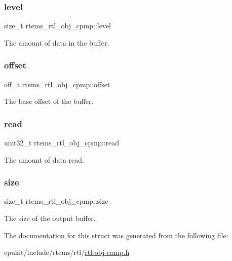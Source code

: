\subsubsection{\texorpdfstring{level}{level}}
{\footnotesize\ttfamily size\+\_\+t rtems\+\_\+rtl\+\_\+obj\+\_\+cpmp\+::level}

The amount of data in the buffer. \mbox{\label{structrtems__rtl__obj__cpmp_af1a66e96bb39b71256675bb98ac9f70d}} 
\subsubsection{\texorpdfstring{offset}{offset}}
{\footnotesize\ttfamily off\+\_\+t rtems\+\_\+rtl\+\_\+obj\+\_\+cpmp\+::offset}

The base offset of the buffer. \mbox{\label{structrtems__rtl__obj__cpmp_ab7be1734b384a5fc89d607fd7fbe24fe}} 
\subsubsection{\texorpdfstring{read}{read}}
{\footnotesize\ttfamily uint32\+\_\+t rtems\+\_\+rtl\+\_\+obj\+\_\+cpmp\+::read}

The amount of data read. \mbox{\label{structrtems__rtl__obj__cpmp_a2001d894253092d12efe50cf9ce50520}} 
\subsubsection{\texorpdfstring{size}{size}}
{\footnotesize\ttfamily size\+\_\+t rtems\+\_\+rtl\+\_\+obj\+\_\+cpmp\+::size}

The size of the output buffer. 

The documentation for this struct was generated from the following file\+:\begin{DoxyCompactItemize}
\item 
cpukit/include/rtems/rtl/\mbox{\hyperlink{rtl-obj-comp_8h}{rtl-\/obj-\/comp.\+h}}\end{DoxyCompactItemize}
